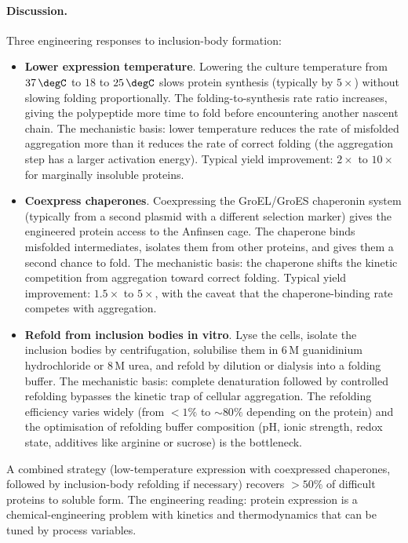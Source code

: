 \paragraph{Discussion.}
Three engineering responses to inclusion-body formation:
\begin{itemize}[leftmargin=*]
\item \textbf{Lower expression temperature}. Lowering the culture
  temperature from $37\,\degC$ to $18$ to $25\,\degC$ slows protein
  synthesis (typically by $5\times$) without slowing folding
  proportionally. The folding-to-synthesis rate ratio increases,
  giving the polypeptide more time to fold before encountering
  another nascent chain. The mechanistic basis: lower temperature
  reduces the rate of misfolded aggregation more than it reduces the
  rate of correct folding (the aggregation step has a larger
  activation energy). Typical yield improvement: $2\times$ to
  $10\times$ for marginally insoluble proteins.
\item \textbf{Coexpress chaperones}. Coexpressing the GroEL/GroES
  chaperonin system (typically from a second plasmid with a different
  selection marker) gives the engineered protein access to the
  Anfinsen cage. The chaperone binds misfolded intermediates,
  isolates them from other proteins, and gives them a second chance
  to fold. The mechanistic basis: the chaperone shifts the kinetic
  competition from aggregation toward correct folding. Typical
  yield improvement: $1.5\times$ to $5\times$, with the caveat that
  the chaperone-binding rate competes with aggregation.
\item \textbf{Refold from inclusion bodies in vitro}. Lyse the cells,
  isolate the inclusion bodies by centrifugation, solubilise them in
  $6\,\text{M}$ guanidinium hydrochloride or $8\,\text{M}$ urea, and
  refold by dilution or dialysis into a folding buffer. The
  mechanistic basis: complete denaturation followed by controlled
  refolding bypasses the kinetic trap of cellular aggregation. The
  refolding efficiency varies widely (from $< 1\%$ to $\sim 80\%$
  depending on the protein) and the optimisation of refolding buffer
  composition (pH, ionic strength, redox state, additives like
  arginine or sucrose) is the bottleneck.
\end{itemize}
A combined strategy (low-temperature expression with coexpressed
chaperones, followed by inclusion-body refolding if necessary)
recovers $> 50\%$ of difficult proteins to soluble form. The
engineering reading: protein expression is a chemical-engineering
problem with kinetics and thermodynamics that can be tuned by
process variables.

